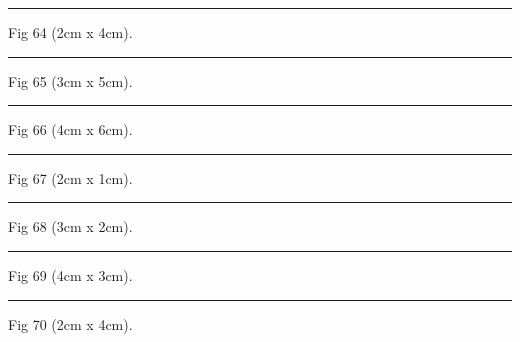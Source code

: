 \documentclass[a4paper,11pt]{article}
\begin{document}
\begin{swarmwrap}%
  \begin{minipage}[t]{2cm}
    \centering
    \rule{\linewidth}{4cm}
    {\footnotesize Fig 64 (2cm x 4cm).}
  \end{minipage}%
\end{swarmwrap}%
\swarmwrapnext
\lipsum[64]%

\begin{swarmwrap}%
  \begin{minipage}[t]{3cm}
    \centering
    \rule{\linewidth}{5cm}
    {\footnotesize Fig 65 (3cm x 5cm).}
  \end{minipage}%
\end{swarmwrap}%
\swarmwrapnext
\lipsum[65]%

\begin{swarmwrap}%
  \begin{minipage}[t]{4cm}
    \centering
    \rule{\linewidth}{6cm}
    {\footnotesize Fig 66 (4cm x 6cm).}
  \end{minipage}%
\end{swarmwrap}%
\swarmwrapnext
\lipsum[66]%

\begin{swarmwrap}%
  \begin{minipage}[t]{2cm}
    \centering
    \rule{\linewidth}{1cm}
    {\footnotesize Fig 67 (2cm x 1cm).}
  \end{minipage}%
\end{swarmwrap}%
\swarmwrapnext
\lipsum[67]%

\begin{swarmwrap}%
  \begin{minipage}[t]{3cm}
    \centering
    \rule{\linewidth}{2cm}
    {\footnotesize Fig 68 (3cm x 2cm).}
  \end{minipage}%
\end{swarmwrap}%
\swarmwrapnext
\lipsum[68]%

\begin{swarmwrap}%
  \begin{minipage}[t]{4cm}
    \centering
    \rule{\linewidth}{3cm}
    {\footnotesize Fig 69 (4cm x 3cm).}
  \end{minipage}%
\end{swarmwrap}%
\swarmwrapnext
\lipsum[69]%

\begin{swarmwrap}%
  \begin{minipage}[t]{2cm}
    \centering
    \rule{\linewidth}{4cm}
    {\footnotesize Fig 70 (2cm x 4cm).}
  \end{minipage}%
\end{swarmwrap}%
\swarmwrapnext
\lipsum[70]%
\end{document}
